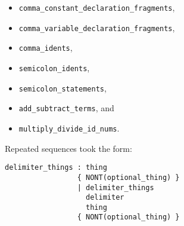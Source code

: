 \documentclass[a4paper,titlepage,12pt]{article}
\begin{document}
\begin{itemize}
	\item\texttt{comma\_constant\_declaration\_fragments},
	\item\texttt{comma\_variable\_declaration\_fragments},
	\item\texttt{comma\_idents},
	\item\texttt{semicolon\_idents},
	\item\texttt{semicolon\_statements},
	\item\texttt{add\_subtract\_terms}, and
	\item\texttt{multiply\_divide\_id\_nums}.
\end{itemize}

Repeated sequences took the form:

\begin{lstlisting}
delimiter_things : thing
                 { NONT(optional_thing) }
                 | delimiter_things
                   delimiter
                   thing
                 { NONT(optional_thing) }
\end{lstlisting}
\end{document}
